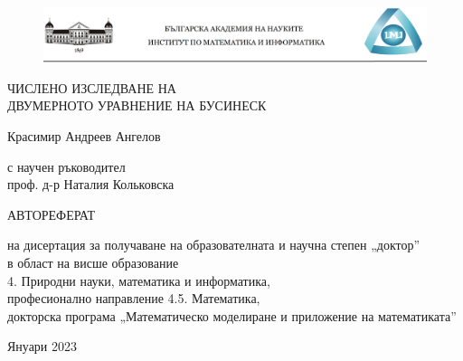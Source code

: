 \documentclass[a5paper]{article}
\theoremstyle{remark}
\begin{document}
\begin{large}

\begin{center}
\begin{figure}[!htb]
      \includegraphics[width=1\linewidth]{LogoThesis.png}
\end{figure}

\begin{minipage}{0.95\linewidth}
    \centering
    \vspace{0.5cm}
    {\Large ЧИСЛЕНО ИЗСЛЕДВАНЕ НА\\ ДВУМЕРНОТО УРАВНЕНИЕ НА БУСИНЕСК\par}
    \vspace{2cm}
    {\Large Красимир Андреев Ангелов \par с научен ръководител \\проф. д-р Наталия Кольковска\par}
    \vspace{2cm}
    {\Large АВТОРЕФЕРАТ\par}
    \vspace{1cm}
    {\large на дисертация за получаване на образователната и научна степен „доктор”\\в област на висше образование\\4. Природни науки, математика и информатика,\\професионално направление 4.5. Математика,\\докторска програма „Математическо моделиране и приложение на математиката”\par}
    \vspace{3cm}
    {\Large Януари 2023}
\end{minipage}
\end{center}
\clearpage

\shipout\null


\tableofcontents
\newpage



\end{large}
\end{document}

